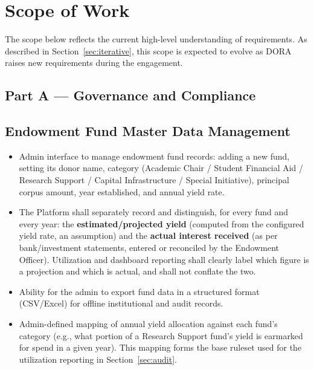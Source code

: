 \documentclass[11pt]{article}
\begin{document}
\section{Scope of Work}
\label{sec:scope}
The scope below reflects the current high-level understanding of requirements. As described in Section~\ref{sec:iterative}, this scope is expected to evolve as DORA raises new requirements during the engagement.

\subsection*{Part A --- Governance and Compliance}

\subsection{Endowment Fund Master Data Management}
\begin{itemize}[leftmargin=1.4em, itemsep=3pt]
\item Admin interface to manage endowment fund records: adding a new fund, setting its donor name, category (Academic Chair / Student Financial Aid / Research Support / Capital Infrastructure / Special Initiative), principal corpus amount, year established, and annual yield rate.
\item The Platform shall separately record and distinguish, for every fund and every year: the \textbf{estimated/projected yield} (computed from the configured yield rate, an assumption) and the \textbf{actual interest received} (as per bank/investment statements, entered or reconciled by the Endowment Officer). Utilization and dashboard reporting shall clearly label which figure is a projection and which is actual, and shall not conflate the two.
\item Ability for the admin to export fund data in a structured format (CSV/Excel) for offline institutional and audit records.
\item Admin-defined mapping of annual yield allocation against each fund's category (e.g., what portion of a Research Support fund's yield is earmarked for spend in a given year). This mapping forms the base ruleset used for the utilization reporting in Section~\ref{sec:audit}.
\end{itemize}
\end{document}
